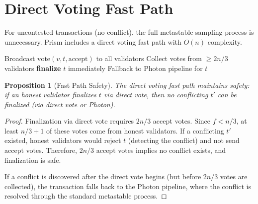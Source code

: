 \documentclass[11pt,a4paper]{article}
\newtheorem{proposition}[theorem]{Proposition}
\begin{document}
\section{Direct Voting Fast Path}
\label{sec:voting}

For uncontested transactions (no conflict), the full metastable sampling process is
unnecessary. Prism includes a direct voting fast path with $O(n)$ complexity.

\begin{algorithm}[H]
\caption{Prism Direct Voting --- Uncontested Fast Path}
\label{alg:voting}
\begin{algorithmic}[1]
     
        \State Broadcast $\text{vote}(v, t, \text{accept})$ to all validators
        \State Collect votes from $\geq 2n/3$ validators
            \State \textbf{finalize} $t$ immediately 
        \Else
            \State Fallback to Photon pipeline for $t$ 
        \EndIf
    \EndIf
\EndFunction
\end{algorithmic}
\end{algorithm}

\begin{proposition}[Fast Path Safety]
\label{prop:fast-path}
The direct voting fast path maintains safety: if an honest validator finalizes $t$
via direct vote, then no conflicting $t'$ can be finalized (via direct vote or Photon).
\end{proposition}

\begin{proof}
Finalization via direct vote requires $2n/3$ accept votes. Since $f < n/3$, at least
$n/3 + 1$ of these votes come from honest validators. If a conflicting $t'$ existed,
honest validators would reject $t$ (detecting the conflict) and not send accept votes.
Therefore, $2n/3$ accept votes implies no conflict exists, and finalization is safe.

If a conflict is discovered after the direct vote begins (but before $2n/3$ votes are
collected), the transaction falls back to the Photon pipeline, where the conflict is
resolved through the standard metastable process.
\end{proof}
\end{document}
